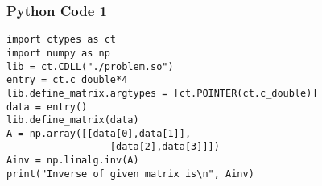 \documentclass{beamer}
\begin{document}
\begin{frame}[fragile]
    \frametitle{Python Code 1}
    \begin{lstlisting}
import ctypes as ct
import numpy as np
lib = ct.CDLL("./problem.so")
entry = ct.c_double*4
lib.define_matrix.argtypes = [ct.POINTER(ct.c_double)]
data = entry()
lib.define_matrix(data)
A = np.array([[data[0],data[1]],
                  [data[2],data[3]]])    
Ainv = np.linalg.inv(A)
print("Inverse of given matrix is\n", Ainv)
    \end{lstlisting}
\end{frame}
\end{document}
